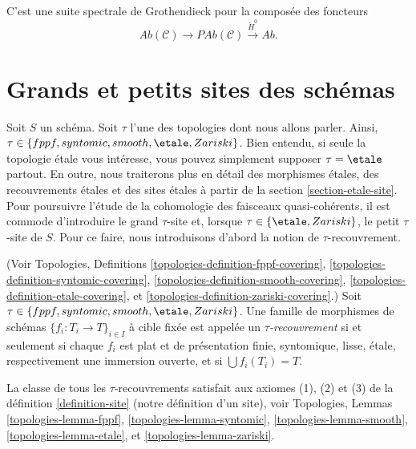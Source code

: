 \begin{remark}
\label{remark-grothendieck-ss}
C'est une suite spectrale de Grothendieck pour la compos\'ee des foncteurs
$$
\textit{Ab}(\mathcal{C}) \longrightarrow
\textit{PAb}(\mathcal{C}) \xrightarrow{\check H^0} \textit{Ab}.
$$
\end{remark}








\section{Grands et petits sites des sch\'emas}
\label{section-big-small}

\noindent
Soit $S$ un sch\'ema.
Soit $\tau$ l'une des topologies dont nous allons parler.
Ainsi, $\tau \in \{fppf, syntomic, smooth, \etale, Zariski\}$.
Bien entendu, si seule la topologie \'etale vous int\'eresse, vous pouvez
simplement supposer $\tau = \etale$ partout. En outre, nous traiterons
plus en d\'etail des morphismes \'etales, des recouvrements \'etales et des sites \'etales
\`a partir de la section \ref{section-etale-site}.
Pour poursuivre l'\'etude de la cohomologie des
faisceaux quasi-coh\'erents, il est commode d'introduire le
grand $\tau$-site et, lorsque $\tau \in \{\etale, Zariski\}$, le
petit $\tau$-site de $S$. Pour ce faire, nous introduisons d'abord
la notion de $\tau$-recouvrement.

\begin{definition}
\label{definition-tau-covering}
(Voir
Topologies, Definitions
\ref{topologies-definition-fppf-covering},
\ref{topologies-definition-syntomic-covering},
\ref{topologies-definition-smooth-covering},
\ref{topologies-definition-etale-covering}, et
\ref{topologies-definition-zariski-covering}.)
Soit $\tau \in \{fppf, syntomic, smooth, \etale, Zariski\}$.
Une famille de morphismes de sch\'emas $\{f_i : T_i \to T\}_{i \in I}$ \`a cible
fix\'ee est appel\'ee un {\it $\tau$-recouvrement} si et seulement si
chaque $f_i$ est plat et de pr\'esentation finie, syntomique, lisse, \'etale,
respectivement une immersion ouverte, et si $\bigcup f_i(T_i) = T$.
\end{definition}

\noindent
La classe de tous les $\tau$-recouvrements satisfait aux axiomes
(1), (2) et (3) de la
d\'efinition \ref{definition-site} (notre d\'efinition d'un site), voir
Topologies, Lemmas
\ref{topologies-lemma-fppf},
\ref{topologies-lemma-syntomic},
\ref{topologies-lemma-smooth},
\ref{topologies-lemma-etale}, et
\ref{topologies-lemma-zariski}.

